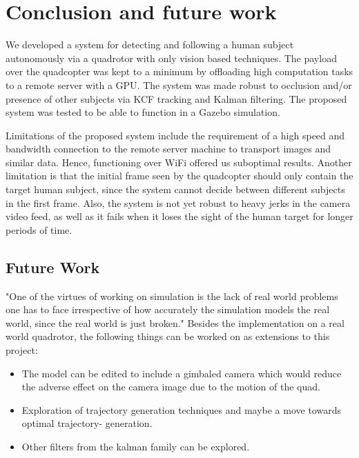 \chapter{Conclusion and future work}

We developed a system for detecting and following a human subject autonomously via a quadrotor with only vision based techniques. The payload over the quadcopter was kept to a minimum by offloading high computation tasks to a remote server with a GPU. The system was made robust to occlusion and/or presence of other subjects via KCF tracking and Kalman filtering. The proposed system was tested to be able to function in a Gazebo simulation.

Limitations of the proposed system include the requirement of a high speed and bandwidth connection to the remote server machine to transport images and similar data. Hence, functioning over WiFi offered us suboptimal results. Another limitation is that the initial frame seen by the quadcopter should only contain the target human subject, since the system cannot decide between different subjects in the first frame. Also, the system is not yet robust to heavy jerks in the camera video feed, as well as it fails when it loses the sight of the human target for longer periods of time.

\newpage
\section{Future Work}

"One of the virtues of working on simulation is the lack
of real world problems one has to face irrespective of how
accurately the simulation models the real world, since the
real world is just broken." Besides the implementation on
a real world quadrotor, the following things can be worked
on as extensions to this project:
\begin{itemize}
	\item The model can be edited to include a gimbaled
	camera which would reduce the adverse effect on
	the camera image due to the motion of the quad.
	\item Exploration of trajectory generation techniques
	and maybe a move towards optimal trajectory-
	generation.
	\item Other filters from the kalman family can be explored.
\end{itemize}








